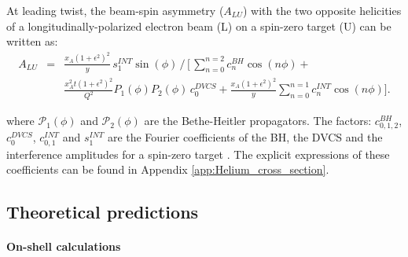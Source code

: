  At leading twist, the beam-spin asymmetry ($A_{LU}$) with the  two opposite helicities of a  longitudinally-polarized electron beam (L) on a spin-zero target (U) can be written as:        
\begin{eqnarray}
A_{LU}& =& \frac{x_A(1+\epsilon^2)^2}{y} \, s_1^{INT} \sin(\phi) \, 
\bigg/ \, \bigg[ \, \sum_{n=0}^{n=2}c_n^{BH}\cos{(n\phi)} +  \\
& & \frac{x_A^2 t {(1+\epsilon^2)}^2}{Q^2} P_1(\phi) P_2(\phi) \, c_0^{DVCS} + 
\frac{x_A (1+\epsilon^2)^2}{y} \sum_{n=0}^{n=1} c_n^{INT} \cos{(n\phi)} \bigg].  \nonumber 
\label{eq:coh_BSA}
\end{eqnarray}

where $\mathcal{P}_1(\phi)$ and $\mathcal {P}_2(\phi)$ are the Bethe-Heitler 
propagators. The factors: $c_{0,1,2}^{BH}$, $c_0^{DVCS}$, $c_{0,1}^{INT}$ and 
$s_1^{INT}$ are the Fourier coefficients of the BH, the DVCS and the 
interference amplitudes for a spin-zero target \cite{Kir}. The explicit 
expressions of these coefficients can be found in Appendix 
\ref{app:Helium_cross_section}.


\subsection{Theoretical predictions} \label{Theoretical_hypotheses}

\paragraph{On-shell calculations} ~

